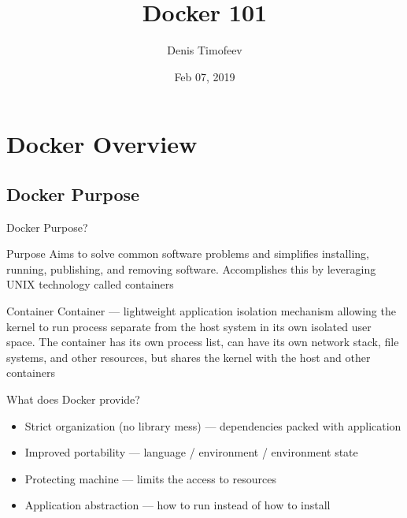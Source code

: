 


\title[Docker]{Docker 101}
\author{Denis Timofeev}
\date{Feb 07, 2019}




\begin{frame}
  \titlepage
\end{frame}

\section{Docker Overview}

\subsection{Docker Purpose}

\begin{frame}{Docker Purpose?}
  \begin{block}{Purpose}
  Aims to solve common software problems and simplifies installing, running, publishing, and removing software. Accomplishes this by leveraging UNIX technology called containers
  \end{block}

  \begin{block}{Container}
  Container --- lightweight application isolation mechanism allowing the kernel to run process separate from the host system in its own isolated user space. The container has its own process list, can have its own network stack, file systems, and other resources, but shares the kernel with the host and other containers
  \end{block}
\end{frame}

\begin{frame}{What does Docker provide?}  
  \begin{itemize}
    \item Strict organization (no library mess) --- dependencies packed with application
    \item Improved portability --- language / environment / environment state
    \item Protecting machine --- limits the access to resources
    \item Application abstraction --- how to run instead of how to install
  \end{itemize}
\end{frame}

